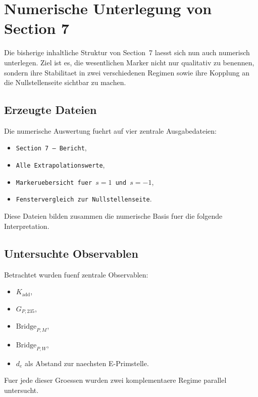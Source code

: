 
\section{Numerische Unterlegung von Section 7}
\label{sec:section7_numerische_unterlegung}

Die bisherige inhaltliche Struktur von Section~7 laesst sich nun auch
numerisch unterlegen. Ziel ist es, die wesentlichen Marker nicht nur
qualitativ zu benennen, sondern ihre Stabilitaet in zwei verschiedenen
Regimen sowie ihre Kopplung an die Nullstellenseite sichtbar zu machen.

\subsection{Erzeugte Dateien}

Die numerische Auswertung fuehrt auf vier zentrale Ausgabedateien:
\begin{itemize}
\item \texttt{Section 7 -- Bericht},
\item \texttt{Alle Extrapolationswerte},
\item \texttt{Markeruebersicht fuer $s=1$ und $s=-1$},
\item \texttt{Fenstervergleich zur Nullstellenseite}.
\end{itemize}

Diese Dateien bilden zusammen die numerische Basis fuer die folgende
Interpretation.

\subsection{Untersuchte Observablen}

Betrachtet wurden fuenf zentrale Observablen:
\begin{itemize}
\item $K_{\mathrm{add}}$,
\item $G_{P,235}$,
\item $\mathrm{Bridge}_{P,M}$,
\item $\mathrm{Bridge}_{P,W}$,
\item $d_e$ als Abstand zur naechsten E-Primstelle.
\end{itemize}

Fuer jede dieser Groessen wurden zwei komplementaere Regime parallel
untersucht.

